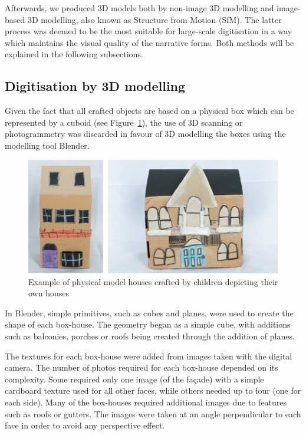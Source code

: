 \documentclass[acmlarge,screen,dvipsnames]{acmart}
\begin{document}
Afterwards, we produced 3D models both by non-image 3D modelling and image-based 3D modelling, also known as Structure from Motion (SfM). The latter process was deemed to be the most suitable for large-scale digitisation in a way which maintains the visual quality of the narrative forms. Both methods will be explained in the following subsections.

\subsection{Digitisation by 3D modelling}
Given the fact that all crafted objects are based on a physical box
which can be represented by a cuboid (see Figure~\ref{fig:boxes}), the use of
3D scanning or photogrammetry was discarded in favour of 3D modelling the
boxes using the modelling tool Blender\cite{blender}. 


\begin{figure}[h] \centering
\includegraphics[width=0.7\linewidth]{images/boxes.png} \caption{Example
of physical model houses crafted by children depicting their own houses}
\label{fig:boxes} \end{figure}

In Blender, simple primitives, such as cubes and planes, were used
to create the shape of each box-house. The geometry began as
a simple cube, with additions such as balconies, porches or roofs being
created through the addition of planes.


The textures for each box-house were added from images taken with the digital
camera. The number of photos required for each box-house depended on its complexity. Some required only one image (of the fa\c{c}ade) with a simple
 cardboard texture used for all other faces, while others needed up to four
 (one for each side). Many of the box-houses required additional images due to
 features such as roofs or gutters. The images were taken at an angle
 perpendicular to each face in order to avoid any perspective effect. 

\end{document}
